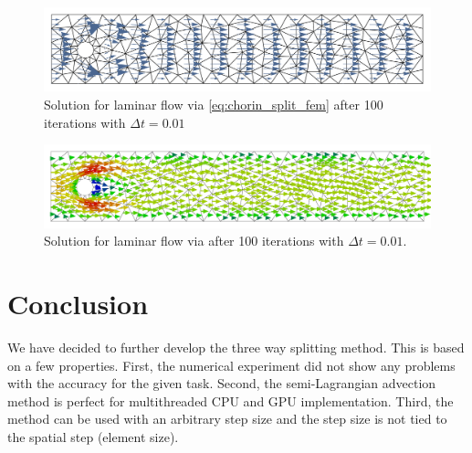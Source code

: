 \begin{figure}[H]
\centering
\includegraphics[width=\textwidth]{Figures/01_introduction/P2P1_100.pdf}
\caption{Solution for laminar flow via \cref{eq:chorin_split_fem} after 100 iterations with $\Delta t = 0.01$ }\label{fig:chorin-plot}
\end{figure}

\begin{figure}[H]
\centering
\includegraphics[width=\textwidth]{Figures/01_introduction/P2P1_adv_diff_100.pdf}
\caption{Solution for laminar flow via  after 100 iterations with $\Delta t = 0.01$.}\label{fig:advection-diffusion-plot}
\end{figure}

\section{Conclusion}
We have decided to further develop the three way splitting method. This is based on a few properties. First, the numerical experiment did not show any problems with the accuracy for the given task. Second, the semi-Lagrangian advection method is perfect for multithreaded CPU and GPU implementation. Third, the method can be used with an arbitrary step size and the step size is not tied to the spatial step (element size).